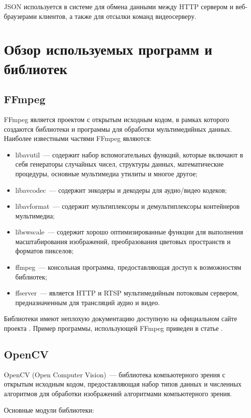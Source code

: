 JSON используется в системе для обмена данными между HTTP сервером и веб-браузерами клиентов,
а также для отсылки команд видеосерверу.

\section{Обзор используемых программ и библиотек}

\subsection{FFmpeg}
FFmpeg \cite{ffmpeg_about} является проектом с открытым исходным кодом, в рамках которого создаются библиотеки и
программы для обработки мультимедийных данных.
Наиболее известными частями FFmpeg являются:
\smallskip
\begin{itemize}
	\item
	libavutil~--- содержит набор вспомогательных функций, которые включают в себя генераторы
	случайных чисел, структуры данных, математические процедуры, основные мультимедиа утилиты
	и многое другое;
	\item
	libavcodec~--- содержит энкодеры и декодеры для аудио/видео кодеков;
	\item
	libavformat~--- содержит мультиплексоры и демультиплексоры контейнеров мультимедиа;
	\item
	libswscale~--- содержит хорошо оптимизированные функции для выполнения масштабирования
	изображений, преобразования цветовых пространств и форматов пикселов;
	\item
	ffmpeg~--- консольная программа, предоставляющая доступ к возможностям библиотек;
	\item
	ffserver~--- является HTTP и RTSP мультимедийным потоковым сервером, предназначенным
	для трансляций аудио и видео.
\end{itemize}
Библиотеки имеют неплохую документацию доступную на официальном сайте проекта \cite{ffmpeg_doc}.
Пример программы, использующей FFmpeg приведен в статье \cite{ffmpeg_example}.

\subsection{OpenCV}
OpenCV (Open Computer Vision)~--- библиотека компьютерного зрения с открытым исходным кодом,
предоставляющая набор типов данных и численных алгоритмов для обработки изображений алгоритмами
компьютерного зрения.

\medskip
Основные модули библиотеки:
\smallskip


